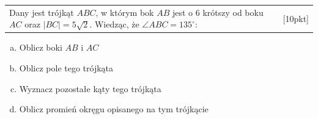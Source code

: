 \documentclass[12pt,a4paper]{article}
\begin{document}
\begin{enumerate}[1.]
	\begin{tabular}{p{13cm} r}
		\item Dany jest trójkąt $ABC$, w którym bok $AB$ jest o 6 krótszy od boku $AC$ oraz $|BC|=5\sqrt{2}$. Wiedząc, że $\angle ABC = 135^\circ$: &[10pkt]\\ 
	\end{tabular}

	\begin{enumerate}[a)]
		\item Oblicz boki $AB$ i $AC$
		\item Oblicz pole tego trójkąta
		\item Wyznacz pozostałe kąty tego trójkąta
		\item Oblicz promień okręgu opisanego na tym trójkącie
	\end{enumerate}

	\end{enumerate}
	
\end{document}
